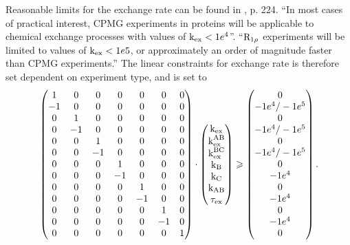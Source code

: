 Reasonable limits for the exchange rate can be found in \citet{Palmer01}, p. 224.
``In most cases of practical interest, CPMG experiments in proteins will be applicable to chemical exchange processes with values of $\textrm{k}_{\textrm{ex}} < 1e^4$''.
``$\mathrm{R}_{1\rho}$ experiments will be limited to values of $\textrm{k}_{\textrm{ex}} < 1e5$, or approximately an order of magnitude faster than CPMG experiments.''
The linear constraints for exchange rate is therefore set dependent on experiment type, and is set to
\begin{equation}
    \begin{pmatrix}
         1 & 0 & 0 & 0 & 0 & 0 & 0 \\
        -1 & 0 & 0 & 0 & 0 & 0 & 0 \\
         0 & 1 & 0 & 0 & 0 & 0 & 0 \\
         0 &-1 & 0 & 0 & 0 & 0 & 0 \\
         0 & 0 & 1 & 0 & 0 & 0 & 0 \\
         0 & 0 &-1 & 0 & 0 & 0 & 0 \\
         0 & 0 & 0 & 1 & 0 & 0 & 0 \\
         0 & 0 & 0 &-1 & 0 & 0 & 0 \\
         0 & 0 & 0 & 0 & 1 & 0 & 0 \\
         0 & 0 & 0 & 0 &-1 & 0 & 0 \\
         0 & 0 & 0 & 0 & 0 & 1 & 0 \\
         0 & 0 & 0 & 0 & 0 &-1 & 0 \\
         0 & 0 & 0 & 0 & 0 & 0 & 1 \\
    \end{pmatrix}
    \cdot
    \begin{pmatrix}
        \textrm{k}_{\textrm{ex}} \\
        \textrm{k}_{\textrm{ex}}^{\textrm{AB}} \\
        \textrm{k}_{\textrm{ex}}^{\textrm{BC}} \\
        \textrm{k}_{\textrm{B}} \\
        \textrm{k}_{\textrm{C}} \\
        \textrm{k}_{\textrm{AB}} \\
        \tau_{\textrm{ex}} \\
    \end{pmatrix}
    \geqslant
    \begin{pmatrix}
        0 \\
        -1e^4 / -1e^5 \\
        0 \\
        -1e^4 / -1e^5 \\
        0 \\
        -1e^4 / -1e^5 \\
        0 \\
        -1e^4 \\
        0 \\
        -1e^4 \\
        0 \\
        -1e^4 \\
        0 \\
    \end{pmatrix}.
\end{equation}

